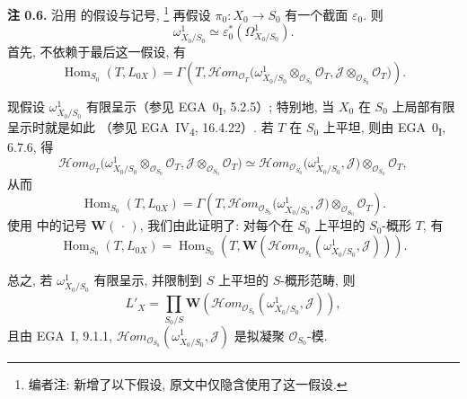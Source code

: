 \medskip
\noindent{}\textbf{注 0.6.}
沿用  的假设与记号,
\footnote{编者注: 新增了以下假设, 原文中仅隐含使用了这一假设.}
再假设 \(\pi_0:X_0\to S_0\) 有一个截面 \(\varepsilon_0\). 则
\[
 \omega^1_{X_0/S_0}\simeq
 \varepsilon_0^*(\Omega^1_{X_0/S_0}).
\]
首先, 不依赖于最后这一假设, 有
\[
 \operatorname{Hom}_{S_0}(T,L_{0X})
 =
 \Gamma\!\left(
   T,
   \mathscr{H}om_{\mathscr O_T}
   \bigl(\omega^1_{X_0/S_0}\otimes_{\mathscr O_{S_0}}\mathscr O_T,
         \mathscr J\otimes_{\mathscr O_{S_0}}\mathscr O_T\bigr)
 \right).
\]

现假设 \(\omega^1_{X_0/S_0}\) 有限呈示（参见 EGA~0\textsubscript{I}, 5.2.5）;
特别地, 当 \(X_0\) 在 \(S_0\) 上局部有限呈示时就是如此
（参见 EGA~IV\textsubscript{4}, 16.4.22）. 若 \(T\) 在 \(S_0\) 上平坦,
则由 EGA~0\textsubscript{I}, 6.7.6, 得
\[
 \mathscr{H}om_{\mathscr O_T}
 \bigl(\omega^1_{X_0/S_0}\otimes_{\mathscr O_{S_0}}\mathscr O_T,
       \mathscr J\otimes_{\mathscr O_{S_0}}\mathscr O_T\bigr)
 \simeq
 \mathscr{H}om_{\mathscr O_{S_0}}
 \bigl(\omega^1_{X_0/S_0},\mathscr J\bigr)
 \otimes_{\mathscr O_{S_0}}\mathscr O_T,
\]
从而
\[
 \operatorname{Hom}_{S_0}(T,L_{0X})
 =
 \Gamma\!\left(
   T,
   \mathscr{H}om_{\mathscr O_{S_0}}
   \bigl(\omega^1_{X_0/S_0},\mathscr J\bigr)
   \otimes_{\mathscr O_{S_0}}\mathscr O_T
 \right).
\]
使用  中的记号
\(\mathbf W(\,\cdot\,)\), 我们由此证明了: 对每个在
\(S_0\) 上平坦的 \(S_0\)-概形 \(T\), 有
\[
 \operatorname{Hom}_{S_0}(T,L_{0X})
 =
 \operatorname{Hom}_{S_0}
 \left(T,
 \mathbf W\!\left(
   \mathscr{H}om_{\mathscr O_{S_0}}
   (\omega^1_{X_0/S_0},\mathscr J)
 \right)\right).
\]

总之, 若 \(\omega^1_{X_0/S_0}\) 有限呈示,
并限制到 \(S\) 上平坦的 \(S\)-概形范畴, 则
\begin{equation}
 L'_X
 =
 \prod_{S_0/S}
 \mathbf W\!\left(
   \mathscr{H}om_{\mathscr O_{S_0}}
   (\omega^1_{X_0/S_0},\mathscr J)
 \right),
 \tag{0.6.1}\label{sga3:iii:remark:0-6:equation:0-6-1}
\end{equation}
且由 EGA~I, 9.1.1,
\(\mathscr{H}om_{\mathscr O_{S_0}}
(\omega^1_{X_0/S_0},\mathscr J)\) 是拟凝聚
\(\mathscr O_{S_0}\)-模.

